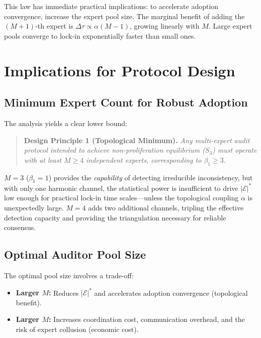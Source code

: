 \documentclass[12pt,a4paper]{article}
\theoremstyle{definition}
\theoremstyle{remark}
\theoremstyle{definition}
\newcommand{\CEC}{\mathcal{E}}
\newcommand{\CECstar}{|\CEC|^*}
\begin{document}
This law has immediate practical implications: to accelerate adoption convergence, increase the expert pool size. The marginal benefit of adding the $(M+1)$-th expert is $\Delta\tau \propto \alpha(M-1)$, growing linearly with $M$. Large expert pools converge to lock-in exponentially faster than small ones.

\section{Implications for Protocol Design}

\subsection{Minimum Expert Count for Robust Adoption}

The analysis yields a clear lower bound:
\begin{quote}
  \textbf{Design Principle 1 (Topological Minimum).} \emph{Any multi-expert audit protocol intended to achieve non-proliferation equilibrium ($S_3$) must operate with at least $M \geq 4$ independent experts, corresponding to $\beta_1 \geq 3$.}
\end{quote}

$M=3$ ($\beta_1=1$) provides the \emph{capability} of detecting irreducible inconsistency, but with only one harmonic channel, the statistical power is insufficient to drive $\CECstar$ low enough for practical lock-in time scales---unless the topological coupling $\alpha$ is unexpectedly large. $M=4$ adds two additional channels, tripling the effective detection capacity and providing the triangulation necessary for reliable consensus.

\subsection{Optimal Auditor Pool Size}

The optimal pool size involves a trade-off:
\begin{itemize}
  \item \textbf{Larger $M$:} Reduces $\CECstar$ and accelerates adoption convergence (topological benefit).
  \item \textbf{Larger $M$:} Increases coordination cost, communication overhead, and the risk of expert collusion (economic cost).
\end{itemize}
\end{document}
